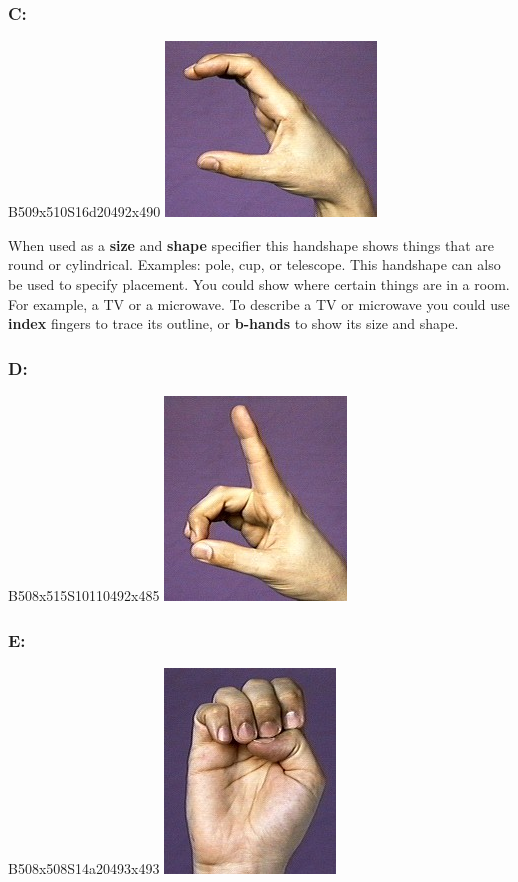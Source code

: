\documentclass{article}
\begin{document}
\subsubsection{C:}

B509x510S16d20492x490
\includegraphics[scale=0.5]{images/c.jpg}

When used as a \textbf{size} and \textbf{shape} specifier this handshape shows things that are round or cylindrical.
Examples: pole, cup, or telescope.
This handshape can also be used to specify placement.
You could show where certain things are in a room.
For example, a TV or a microwave.
To describe a TV or microwave you could use \textbf{index} fingers to trace its outline, or \textbf{b-hands} to show its size and shape.

\subsubsection{D:}

B508x515S10110492x485
\includegraphics[scale=0.5]{images/d.jpg}

\subsubsection{E:}

B508x508S14a20493x493
\includegraphics[scale=0.5]{images/e.jpg}
\end{document}
